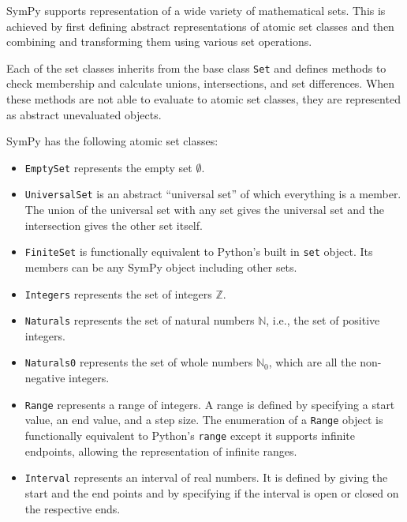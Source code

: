 
SymPy supports representation of a wide variety of mathematical sets. This is
achieved by first defining abstract representations of atomic set classes and
then combining and transforming them using various set operations.

Each of the set classes inherits from the base class \texttt{Set} and defines
methods to check membership and calculate unions, intersections, and set
differences. When these methods are not able to evaluate to atomic set
classes, they are represented as abstract unevaluated objects.

SymPy has the following atomic set classes:

\begin{itemize}

    \item \verb|EmptySet| represents the empty set $\emptyset$.

    \item \verb|UniversalSet| is an abstract ``universal set'' of which
      everything is a member. The union of the universal set with any set
      gives the universal set and the intersection gives the other set itself.

    \item \verb|FiniteSet| is functionally equivalent to Python's built
      in \texttt{set} object. Its members can be any SymPy object including
      other sets.

    \item \verb|Integers| represents the set of integers $\mathbb{Z}$.

    \item \verb|Naturals| represents the set of natural numbers $\mathbb{N}$,
      i.e., the set of positive integers.

    \item \verb|Naturals0| represents the set of whole numbers $\mathbb{N}_0$,
      which are all the non-negative integers.

    \item \verb|Range| represents a range of integers. A range is defined by
      specifying a start value, an end value, and a step size. The enumeration
      of a \texttt{Range} object is functionally equivalent to Python's
      \texttt{range} except it supports infinite endpoints, allowing the
      representation of infinite ranges.

    \item \verb|Interval| represents an interval of real numbers. It is
      defined by giving the start and the end points and by specifying if the interval is open
      or closed on the respective ends.


\end{itemize}


